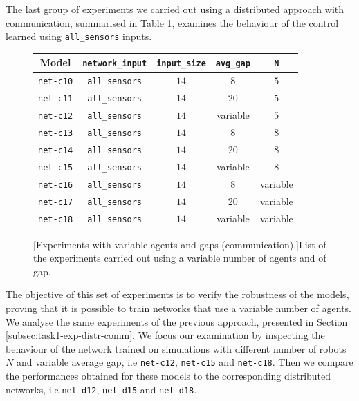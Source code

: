 The last group of experiments we carried out using a distributed approach with 
communication, summarised in Table \ref{tab:modelcomm}, examines the 
behaviour of the control learned using \texttt{all\_sensors} inputs. 
\begin{figure}[!htb]
	\centering
	\begin{tabular}{ccccc}
		\toprule
		\textbf{Model} \quad & \textbf{\texttt{network\_input}} & 
		\textbf{\texttt{input\_size}} & \textbf{\texttt{avg\_gap}} & \textbf{\texttt{N}}\\
		\midrule
		\texttt{net-c10} 	& \texttt{all\_sensors}		&  $14$  &  $8$		 	 &	 $5$ \\
		\texttt{net-c11} 	& \texttt{all\_sensors}		&  $14$  &  $20$		&	$5$ \\
		\texttt{net-c12} 	& \texttt{all\_sensors}		&  $14$  &  variable   &    $5$\\
		\texttt{net-c13} 	& \texttt{all\_sensors}	  	&  $14$  &  $8$			 &	  $8$ \\
		\texttt{net-c14} 	& \texttt{all\_sensors}	  	&  $14$  &  $20$   		&	 $8$ \\
		\texttt{net-c15} 	& \texttt{all\_sensors}	  	&  $14$  &  variable	&	 $8$ \\
		\texttt{net-c16} 	& \texttt{all\_sensors}	  	&  $14$  &  $ 8$		  &	 variable\\
		\texttt{net-c17} 	& \texttt{all\_sensors}	  	&  $14$  &  $20$		 &	variable\\
		\texttt{net-c18} 	& \texttt{all\_sensors}	  	&  $14$  &  variable	 &	
		variable\\
		\bottomrule
	\end{tabular}
	[Experiments with variable agents and gaps 
	(communication).]{List of the experiments carried out using a variable number 
		of agents and of gap.}
	\label{tab:modelcomm}
\end{figure}

The objective of this set of experiments is to verify the robustness of the models, 
proving that it is possible to train networks that use a variable number of agents.
We analyse the same experiments of the previous approach, presented in Section 
\ref{subsec:task1-exp-distr-comm}.
We focus our examination by inspecting the behaviour of the network trained on 
simulations with different number of robots $N$ and variable average gap, i.e 
\texttt{net-c12}, \texttt{net-c15} and \texttt{net-c18}. Then we compare 
the 
performances obtained for these models to the corresponding distributed 
networks, i.e \texttt{net-d12}, \texttt{net-d15} and \texttt{net-d18}.

